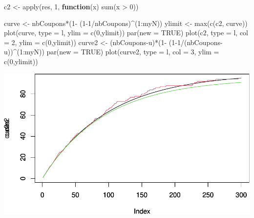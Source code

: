 \documentclass[
]{article}
\newenvironment{Shaded}{\begin{snugshade}}{\end{snugshade}}
\newcommand{\AttributeTok}[1]{\textcolor[rgb]{0.77,0.63,0.00}{#1}}
\newcommand{\ConstantTok}[1]{\textcolor[rgb]{0.00,0.00,0.00}{#1}}
\newcommand{\ControlFlowTok}[1]{\textcolor[rgb]{0.13,0.29,0.53}{\textbf{#1}}}
\newcommand{\DecValTok}[1]{\textcolor[rgb]{0.00,0.00,0.81}{#1}}
\newcommand{\FunctionTok}[1]{\textcolor[rgb]{0.00,0.00,0.00}{#1}}
\newcommand{\NormalTok}[1]{#1}
\newcommand{\OtherTok}[1]{\textcolor[rgb]{0.56,0.35,0.01}{#1}}
\newcommand{\SpecialCharTok}[1]{\textcolor[rgb]{0.00,0.00,0.00}{#1}}
\newcommand{\StringTok}[1]{\textcolor[rgb]{0.31,0.60,0.02}{#1}}
\begin{document}
\begin{Shaded}
\begin{Highlighting}[]
\NormalTok{c2 }\OtherTok{\textless{}{-}} \FunctionTok{apply}\NormalTok{(res, }\DecValTok{1}\NormalTok{, }\ControlFlowTok{function}\NormalTok{(x) }\FunctionTok{sum}\NormalTok{(x }\SpecialCharTok{\textgreater{}} \DecValTok{0}\NormalTok{))}

\NormalTok{curve }\OtherTok{\textless{}{-}}\NormalTok{ nbCoupons}\SpecialCharTok{*}\NormalTok{(}\DecValTok{1}\SpecialCharTok{{-}}\NormalTok{ (}\DecValTok{1{-}1}\SpecialCharTok{/}\NormalTok{nbCoupons)}\SpecialCharTok{\^{}}\NormalTok{(}\DecValTok{1}\SpecialCharTok{:}\NormalTok{myN))}
\NormalTok{ylimit }\OtherTok{\textless{}{-}} \FunctionTok{max}\NormalTok{(}\FunctionTok{c}\NormalTok{(c2, curve))}
\FunctionTok{plot}\NormalTok{(curve, }\AttributeTok{type =} \StringTok{\textquotesingle{}l\textquotesingle{}}\NormalTok{, }\AttributeTok{ylim =} \FunctionTok{c}\NormalTok{(}\DecValTok{0}\NormalTok{,ylimit))}
\FunctionTok{par}\NormalTok{(}\AttributeTok{new =} \ConstantTok{TRUE}\NormalTok{)}
\FunctionTok{plot}\NormalTok{(c2, }\AttributeTok{type =} \StringTok{\textquotesingle{}l\textquotesingle{}}\NormalTok{, }\AttributeTok{col =} \DecValTok{2}\NormalTok{, }\AttributeTok{ylim =} \FunctionTok{c}\NormalTok{(}\DecValTok{0}\NormalTok{,ylimit))}
\NormalTok{curve2 }\OtherTok{\textless{}{-}}\NormalTok{ (nbCoupons}\SpecialCharTok{{-}}\NormalTok{u)}\SpecialCharTok{*}\NormalTok{(}\DecValTok{1}\SpecialCharTok{{-}}\NormalTok{ (}\DecValTok{1{-}1}\SpecialCharTok{/}\NormalTok{(nbCoupons}\SpecialCharTok{{-}}\NormalTok{u))}\SpecialCharTok{\^{}}\NormalTok{(}\DecValTok{1}\SpecialCharTok{:}\NormalTok{myN))}
\FunctionTok{par}\NormalTok{(}\AttributeTok{new =} \ConstantTok{TRUE}\NormalTok{)}
\FunctionTok{plot}\NormalTok{(curve2, }\AttributeTok{type =} \StringTok{\textquotesingle{}l\textquotesingle{}}\NormalTok{, }\AttributeTok{col =} \DecValTok{3}\NormalTok{, }\AttributeTok{ylim =} \FunctionTok{c}\NormalTok{(}\DecValTok{0}\NormalTok{,ylimit))}
\end{Highlighting}
\end{Shaded}

\includegraphics{examples_files/figure-latex/unnamed-chunk-2-2.pdf}
\end{document}
